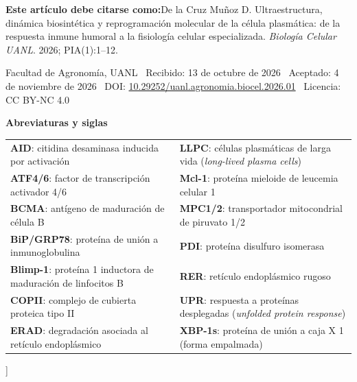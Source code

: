 \documentclass[10pt,spanish,letterpaper,twocolumn]{article}
\begin{document}
{  \begin{tcolorbox}[colback=citabg, colframe=citaframe, boxrule=0.5pt, arc=1.2mm, left=6pt, right=6pt, top=3.5pt, bottom=3.5pt]
  {\fontsize{7.5}{9.5}\selectfont
  \textbf{Este artículo debe citarse como:}\enspace De la Cruz Muñoz D. Ultraestructura, dinámica biosintética y reprogramación molecular de la célula plasmática: de la respuesta inmune humoral a la fisiología celular especializada. \textit{Biología Celular UANL}. 2026; PIA(1):1--12.
  \par\vspace{0.04cm}
  \color{gray!80!black}
  Facultad de Agronomía, UANL \textbar\ Recibido: 13 de octubre de 2026 \textbar\ Aceptado: 4 de noviembre de 2026 \textbar\ DOI: \href{https://doi.org/10.29252/uanl.agronomia.biocel.2026.01}{10.29252/uanl.agronomia.biocel.2026.01} \textbar\ Licencia: CC BY-NC 4.0
  }
  \end{tcolorbox}
  \vspace{0.1cm}

  {\fontsize{8.5}{10.5}\selectfont\bfseries\color{uanlblue} Abreviaturas y siglas}\\[0.04cm]
  {\fontsize{7.5}{9.5}\selectfont
  \begin{tabular*}{\textwidth}{@{\extracolsep{\fill}}ll@{}}
  \textbf{AID}: citidina desaminasa inducida por activación & \textbf{LLPC}: células plasmáticas de larga vida (\emph{long-lived plasma cells})\\
  \textbf{ATF4/6}: factor de transcripción activador 4/6 & \textbf{Mcl-1}: proteína mieloide de leucemia celular 1\\
  \textbf{BCMA}: antígeno de maduración de célula B & \textbf{MPC1/2}: transportador mitocondrial de piruvato 1/2\\
  \textbf{BiP/GRP78}: proteína de unión a inmunoglobulina & \textbf{PDI}: proteína disulfuro isomerasa\\
  \textbf{Blimp-1}: proteína 1 inductora de maduración de linfocitos B & \textbf{RER}: retículo endoplásmico rugoso\\
  \textbf{COPII}: complejo de cubierta proteica tipo II & \textbf{UPR}: respuesta a proteínas desplegadas (\emph{unfolded protein response})\\
  \textbf{ERAD}: degradación asociada al retículo endoplásmico & \textbf{XBP-1s}: proteína de unión a caja X 1 (forma empalmada)
  \end{tabular*}
  }
  \vspace{0.15cm}
}]



\newpage
\printbibliography[title={Referencias bibliográficas}]
\end{document}
